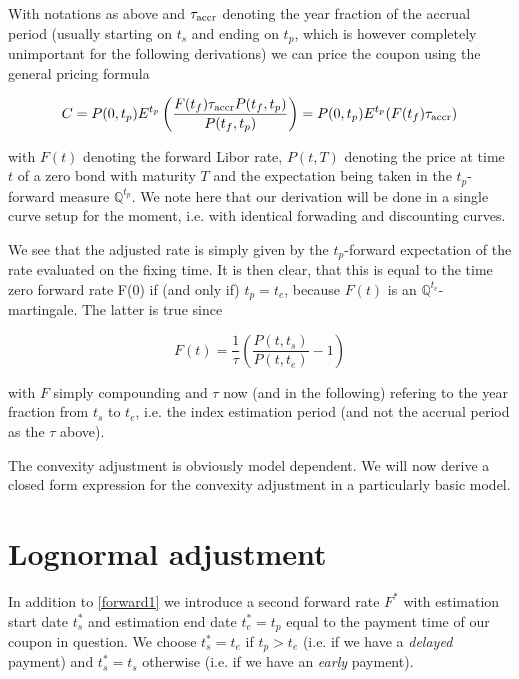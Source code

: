 \documentclass{amsart}
\theoremstyle{plain}
\numberwithin{equation}{section}
\begin{document}
With notations as above and $\tau_{\textnormal{accr}}$ denoting the year fraction of the accrual period (usually starting on $t_s$ and
ending on $t_p$, which is however completely unimportant for the following derivations) we can price the coupon using
the general pricing formula

\begin{equation}\label{generaladjustment}
C = P(0,t_p) E^{t_p} \left( \frac{F(t_f)\tau_{\textnormal{accr}} P(t_f,t_p)}{P(t_f,t_p)} \right) = P(0,t_p) E^{t_p} ( F(t_f) \tau_{\textnormal{accr}} )
\end{equation}

with $F(t)$ denoting the forward Libor rate, $P(t,T)$ denoting the price at time $t$ of a zero bond with maturity $T$
and the expectation being taken in the $t_p$-forward measure $\mathbb{Q}^{t_p}$. We note here that our derivation will be done in a single
curve setup for the moment, i.e. with identical forwading and discounting curves.

We see that the adjusted rate is simply given by the $t_p$-forward expectation of the rate evaluated on the fixing time. It is
then clear, that this is equal to the time zero forward rate F(0) if (and only if) $t_p = t_e$, because $F(t)$ is an $\mathbb{Q}^{t_e}$-martingale.
The latter is true since

\begin{equation}\label{forward1}
F(t) = \frac{1}{\tau} \left( \frac{P(t,t_s)}{P(t,t_e)} -1 \right)   
\end{equation}

with $F$ simply compounding and $\tau$ now (and in the following) refering to the year fraction from $t_s$ to $t_e$, i.e. the index estimation period (and not the accrual period as the $\tau$ above).

The convexity adjustment is obviously model dependent. We will now derive a closed
form expression for the convexity adjustment in a particularly basic model.

\section{Lognormal adjustment}

In addition to \ref{forward1} we introduce a second forward rate $F^*$ with estimation start date $t_s^*$ and estimation end
date $t_e^* = t_p$ equal to the payment time of our coupon in question. We choose $t_s^* = t_e$ if $t_p > t_e$ (i.e. if we have
a \textit{delayed} payment) and $t_s^* = t_s$ otherwise (i.e. if we have an \textit{early} payment).
\end{document}
